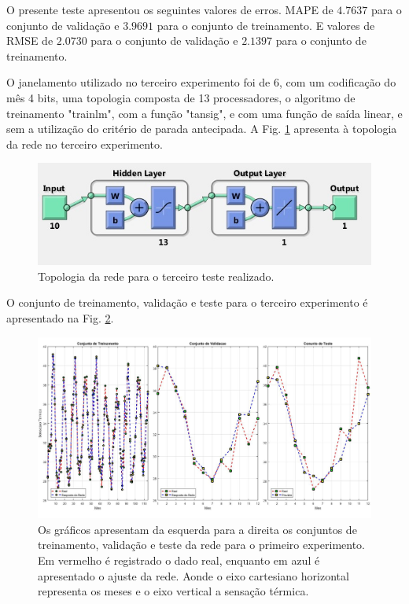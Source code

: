 \documentclass[journal, a4paper]{IEEEtran}
\begin{document}
O presente teste apresentou os seguintes valores de erros. MAPE de $4.7637$ para o conjunto de validação e $3.9691$ para o conjunto de treinamento. E valores de RMSE de $2.0730$ para o conjunto de validação e $2.1397$ para o conjunto de treinamento. 

O janelamento utilizado no terceiro experimento foi de 6, com um codificação do mês 4 bits, uma topologia composta de 13 processadores, o algoritmo de treinamento "trainlm", com a função "tansig", e com uma função de saída linear, e sem a utilização do critério de parada antecipada. A Fig. \ref{topo3} apresenta à topologia da rede no terceiro experimento. 

\begin{figure}[H]
	\centering
	\includegraphics[scale=0.5]{Images/topologia3.jpg}
	\caption{Topologia da rede para o terceiro teste realizado.}
	\label{topo3}
\end{figure} 


O conjunto de treinamento, validação e teste para o terceiro experimento é apresentado na Fig. \ref{teste3}.

\begin{figure}[H]
	\centering
	\includegraphics[scale=0.15]{Images/Teste3.jpg}
	\caption{Os gráficos apresentam da esquerda para a direita os conjuntos de treinamento, validação e teste da rede para o primeiro experimento. Em vermelho é registrado o dado real, enquanto em azul é apresentado o ajuste da rede. Aonde o eixo cartesiano horizontal representa os meses e o eixo vertical a sensação térmica.}
	\label{teste3}
\end{figure} 
\end{document}
